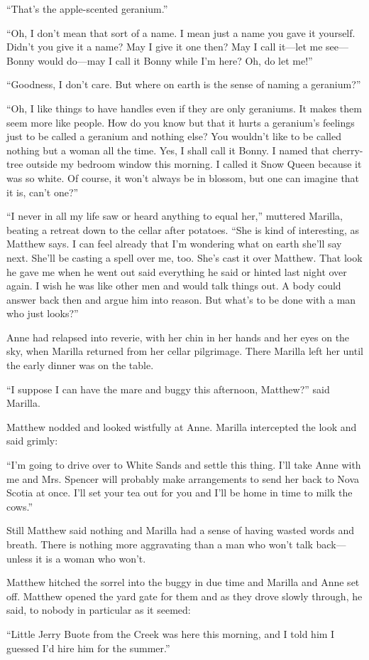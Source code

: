 \documentclass[a4paper]{article}
\begin{document}
\footnotesize{``That's the apple-scented geranium.''

``Oh, I don't mean that sort of a name. I mean just a name you gave it yourself. Didn't you give it a name? May I give it one then? May I call it---let me see---Bonny would do---may I call it Bonny while I'm here? Oh, do let me!''

``Goodness, I don't care. But where on earth is the sense of naming a geranium?''

``Oh, I like things to have handles even if they are only geraniums. It makes them seem more like people. How do you know but that it hurts a geranium's feelings just to be called a geranium and nothing else? You wouldn't like to be called nothing but a woman all the time. Yes, I shall call it Bonny. I named that cherry-tree outside my bedroom window this morning. I called it Snow Queen because it was so white. Of course, it won't always be in blossom, but one can imagine that it is, can't one?''}

\small{``I never in all my life saw or heard anything to equal her,'' muttered Marilla, beating a retreat down to the cellar after potatoes. ``She is kind of interesting, as Matthew says. I can feel already that I'm wondering what on earth she'll say next. She'll be casting a spell over me, too. She's cast it over Matthew. That look he gave me when he went out said everything he said or hinted last night over again. I wish he was like other men and would talk things out. A body could answer back then and argue him into reason. But what's to be done with a man who just looks?''

Anne had relapsed into reverie, with her chin in her hands and her eyes on the sky, when Marilla returned from her cellar pilgrimage. There Marilla left her until the early dinner was on the table.

``I suppose I can have the mare and buggy this afternoon, Matthew?'' said Marilla.

Matthew nodded and looked wistfully at Anne. Marilla intercepted the look and said grimly:}

\normalsize{``I'm going to drive over to White Sands and settle this thing. I'll take Anne with me and Mrs. Spencer will probably make arrangements to send her back to Nova Scotia at once. I'll set your tea out for you and I'll be home in time to milk the cows.''

Still Matthew said nothing and Marilla had a sense of having wasted words and breath. There is nothing more aggravating than a man who won't talk back---unless it is a woman who won't.

Matthew hitched the sorrel into the buggy in due time and Marilla and Anne set off. Matthew opened the yard gate for them and as they drove slowly through, he said, to nobody in particular as it seemed:

``Little Jerry Buote from the Creek was here this morning, and I told him I guessed I'd hire him for the summer.''}
\end{document}
